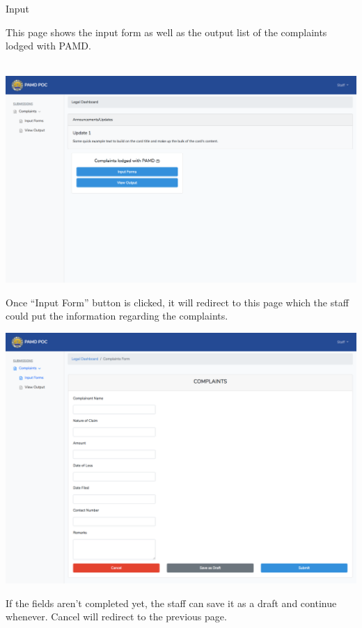 \documentclass{article}
\begin{document}
\noindent{}Input%

This page shows the input form as well as the output
list of the complaints lodged with PAMD.%

 \includegraphics[keepaspectratio=true]{up-ic-screens/image196}{}%

Once “Input Form” button is clicked, it will redirect to this page which the
staff could put the information regarding the complaints.%

\includegraphics[keepaspectratio=true]{up-ic-screens/image158}{}%

If the fields aren’t completed yet, the staff can save
it as a draft and continue whenever. Cancel will redirect to the
previous page.%
\end{document}
